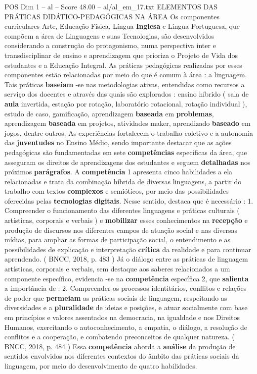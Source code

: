 \begin{textsample}{POS Dim 1 – al – Score 48.00 – al/al\_em\_17.txt}  \label{ex:f1_pos_154}
ELEMENTOS DAS PRÁTICAS DIDÁTICO-PEDAGÓGICAS NA ÁREA Os componentes curriculares Arte, Educação Física, Língua \textbf{Inglesa} e Língua Portuguesa, que compõem a área de Linguagens e suas Tecnologias, são desenvolvidos considerando a construção do protagonismo, numa perspectiva inter e transdisciplinar de ensino e aprendizagem que prioriza o Projeto de Vida dos estudantes e a Educação Integral.
As práticas pedagógicas realizadas por esses componentes estão relacionadas por meio do que é comum à área : a linguagem.
Tais práticas \textbf{baseiam} -se nas metodologias ativas, entendidas como recursos a serviço dos docentes e através das quais são explorados : ensino híbrido ( sala de \textbf{aula} invertida, estação por rotação, laboratório rotacional, rotação individual ), estudo de caso, gamificação, aprendizagem \textbf{baseada} em \textbf{problemas}, aprendizagem \textbf{baseada} em projetos, atividades maker, aprendizado \textbf{baseado} em jogos, dentre outros.
As experiências fortalecem o trabalho coletivo e a autonomia das \textbf{juventudes} no Ensino Médio, sendo importante destacar que as ações pedagógicas são fundamentadas em sete \textbf{competências} específicas da área, que asseguram os direitos de aprendizagens dos estudantes e seguem \textbf{detalhadas} nos próximos \textbf{parágrafos}.
A \textbf{competência} 1 apresenta cinco habilidades a ela relacionadas e trata da combinação híbrida de diversas linguagens, a partir do trabalho com textos \textbf{complexos} e semióticos, por meio das possibilidades oferecidas pelas \textbf{tecnologias} \textbf{digitais}.
Nesse sentido, destaca que é necessário : 1.
Compreender o funcionamento das diferentes linguagens e práticas culturais ( artísticas, corporais e verbais ) e \textbf{mobilizar} esses conhecimentos na \textbf{recepção} e produção de discursos nos diferentes campos de atuação social e nas diversas mídias, para ampliar as formas de participação social, o entendimento e as possibilidades de explicação e interpretação \textbf{crítica} da realidade e para continuar aprendendo. ( BNCC, 2018, p. 483 ) Já o diálogo entre as práticas de linguagem artísticas, corporais e verbais, sem destaque aos saberes relacionados a um componente específico, evidencia -se na \textbf{competência} específica 2, que \textbf{salienta} a importância de : 2.
Compreender os processos identitários, conflitos e relações de poder que \textbf{permeiam} as práticas sociais de linguagem, respeitando as diversidades e a \textbf{pluralidade} de ideias e posições, e atuar socialmente com base em princípios e valores assentados na democracia, na igualdade e nos Direitos Humanos, exercitando o autoconhecimento, a empatia, o diálogo, a resolução de conflitos e a cooperação, e combatendo preconceitos de qualquer natureza. ( BNCC, 2018, p. 484 ) Essa \textbf{competência} aborda a \textbf{análise} da produção de sentidos envolvidos nos diferentes contextos do âmbito das práticas sociais da linguagem, por meio do desenvolvimento de quatro habilidades.

\end{textsample}
